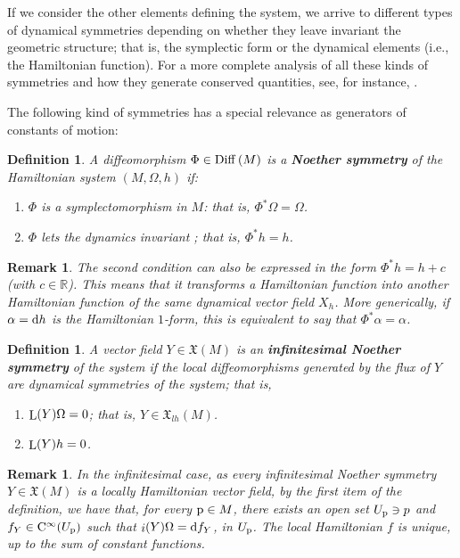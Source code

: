\documentclass[12pt]{report}
\newtheorem{definition}[teor]{Definition}
\newtheorem{remark}[teor]{Remark}
\def\ben{\begin{enumerate}}
\def\een{\end{enumerate}}
\def\vf{\mathfrak X}
\def\d{{\rm d}}
\def\Real{\mathbb{R}}
\def\Lie{\mathop{\rm L}\nolimits}
\def\inn{\mathop{i}\nolimits}
\def\Cinfty{{\rm C}^\infty}
\begin{document}
If we consider the other elements defining the system, we arrive to different types of dynamical symmetries  depending on whether they leave invariant the geometric structure;
that is, the symplectic form or the dynamical elements
(i.e., the Hamiltonian function). 
For a more complete analysis of all these kinds of symmetries
and how they generate conserved quantities, see, for instance, \cite{Ch-2003,Ch-2005,NRR-2018,SC-81,SC-81b}.

The following kind of symmetries has a special relevance as
generators of constants of motion:

\begin{definition}
A diffeomorphism $\Phi\in{\rm Diff}\, (M)$ is a  \textbf{Noether symmetry}
of the Hamiltonian system $(M,\Omega,h)$ if:
\ben
\item
$\Phi$ is a symplectomorphism in $M$: that is, $\Phi^*\Omega =\Omega$.
\item
$\Phi$ lets the dynamics invariant ; that is, $\Phi^*h =h$.
\een
\label{sime1}
\end{definition}

\begin{remark}{\rm 
The second condition can also be expressed in the form
$\Phi^*h =h+c$ (with $c\in\Real$).
This means that it transforms a Hamiltonian function into another 
Hamiltonian function of the same dynamical vector field $X_h$.
More generically, if $\alpha=\d h$ is the Hamiltonian $1$-form, this is equivalent to say that $\Phi^*\alpha=\alpha$.
}\end{remark}

\begin{definition}
A vector field $Y\in\vf (M)$ is an \textbf{infinitesimal Noether symmetry}
of the system if  the local diffeomorphisms  generated by the flux of $Y$
are dynamical symmetries of the system; that is,
\ben
\item
$\Lie (Y)\Omega =0$; that is, $Y\in\vf_{lh}(M)$.
\item
$\Lie (Y)h =0$.
\een
\label{simeinf1}
\end{definition}

\begin{remark}{\rm 
In the infinitesimal case, as every infinitesimal Noether symmetry
$Y\in\vf(M)$ is a locally Hamiltonian vector field, by the first item of the definition,
we have that, for every ${\rm p}\in M$, there exists an open set $U_{\rm p}\ni p$ 
and $f_Y\in\Cinfty (U_{\rm p})$ such that $\inn(Y)\Omega=\d f_Y$, in $U_{\rm p}$. The local Hamiltonian $f$ is unique, up to the sum of constant functions. 
}\end{remark}
\end{document}
